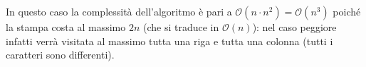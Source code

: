 \documentclass[../cheatSheetAlgoritmi.tex]{subfiles}
\begin{document}
In questo caso la complessità dell'algoritmo è pari a $\mathcal{O}(n \cdot n^{2}) = \mathcal{O}(n^{3})$ poiché la stampa costa al massimo $2n$ (che si traduce in $\mathcal{O}(n)$): nel caso peggiore infatti verrà visitata al massimo tutta una riga e tutta una colonna (tutti i caratteri sono differenti).
\newpage
\end{document}
